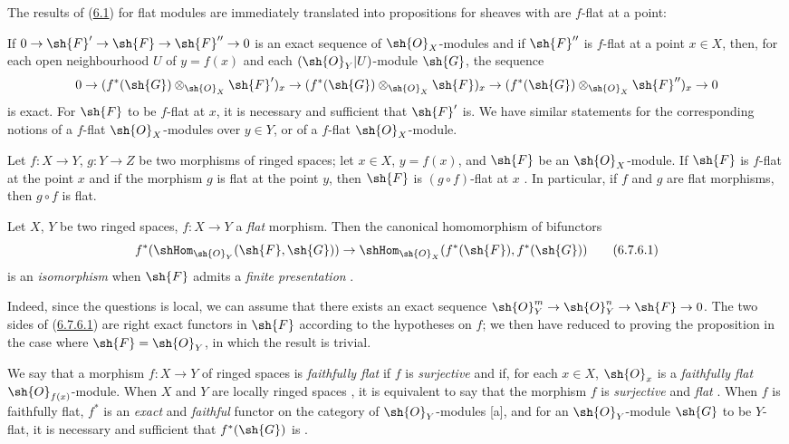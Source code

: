 \begin{env}[6.7.4]
\label{0.6.7.4}
The results of (\hyperref[subsection:0.6.1]{6.1}) for flat modules are immediately translated into propositions for
sheaves with are $f$-flat at a point:

If $0\to\sh{F}'\to\sh{F}\to\sh{F}''\to 0$ is an exact sequence of $\sh{O}_X$-modules and if
$\sh{F}''$ is $f$-flat at a point $x\in X$, then, for each open neighbourhood $U$ of $y=f(x)$
and each $(\sh{O}_Y|U)$-module $\sh{G}$, the sequence
\[
  0\to(f^*(\sh{G})\otimes_{\sh{O}_X}\sh{F}')_x
  \to(f^*(\sh{G})\otimes_{\sh{O}_X}\sh{F})_x
  \to(f^*(\sh{G})\otimes_{\sh{O}_X}\sh{F}'')_x\to 0
\]
is exact. For $\sh{F}$ to be $f$-flat at $x$, it is necessary and sufficient that $\sh{F}'$
is. We have similar statements for the corresponding notions of a $f$-flat $\sh{O}_X$-modules
over $y\in Y$, or of a $f$-flat $\sh{O}_X$-module.
\end{env}

\begin{env}[6.7.5]
\label{0.6.7.5}
Let $f:X\to Y$, $g:Y\to Z$ be two morphisms of ringed spaces; let $x\in X$, $y=f(x)$, and
$\sh{F}$ be an $\sh{O}_X$-module. If $\sh{F}$ is $f$-flat at the point $x$ and if the morphism
$g$ is flat at the point $y$, then $\sh{F}$ is $(g\circ f)$-flat at $x$ . In
particular, if $f$ and $g$ are flat morphisms, then $g\circ f$ is flat.
\end{env}

\begin{env}[6.7.6]
\label{0.6.7.6}
Let $X$, $Y$ be two ringed spaces, $f:X\to Y$ a \emph{flat} morphism. Then the canonical
homomorphism of bifunctors 
\[
\label{0.6.7.6.1}
  f^*(\shHom_{\sh{O}_Y}(\sh{F},\sh{G}))\to\shHom_{\sh{O}_X}(f^*(\sh{F}),f^*(\sh{G}))
  \tag{6.7.6.1}
\]
is an \emph{isomorphism} when $\sh{F}$ admits a \emph{finite presentation} .

Indeed, since the questions is local, we can assume that there exists an exact sequence
$\sh{O}_Y^m\to\sh{O}_Y^n\to\sh{F}\to 0$. The two sides of (\hyperref[0.6.7.6.1]{6.7.6.1}) are right exact functors in
$\sh{F}$ according to the hypotheses on $f$; we then have reduced to proving the proposition
in the case where $\sh{F}=\sh{O}_Y$, in which the result is trivial.
\end{env}

\begin{env}[6.7.8]
\label{0.6.7.8}
We say that a morphism $f:X\to Y$ of ringed spaces is \emph{faithfully flat} if $f$ is
\emph{surjective} and if, for each $x\in X$, $\sh{O}_x$ is a \emph{faithfully flat}
$\sh{O}_{f(x)}$-module. When $X$ and $Y$ are locally ringed spaces , it is
equivalent to say that the morphism $f$ is \emph{surjective} and \emph{flat}
. When $f$ is faithfully flat, $f^*$ is an \emph{exact} and \emph{faithful}
functor on the category of $\sh{O}_Y$-modules [a], and for an $\sh{O}_Y$-module
$\sh{G}$ to be $Y$-flat, it is necessary and sufficient that $f^*(\sh{G})$ is
.
\end{env}

